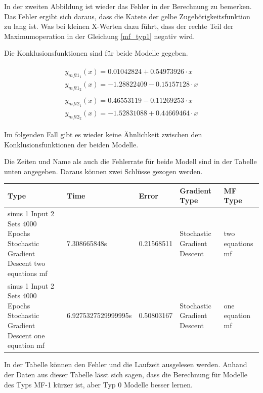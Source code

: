 In der zweiten Abbildung ist wieder das Fehler in der Berechnung zu bemerken. Das Fehler ergibt sich daraus, dass die Katete der gelbe Zugehörigkeitsfunktion zu lang ist. Was bei kleinen X-Werten dazu führt, dass der rechte Teil der Maximumoperation in der Gleichung \ref{mf_typ1} negativ wird.

Die Konklusionsfunktionen sind für beide Modelle gegeben.


\begin{align}
	\begin{split}\label{mf_0:10}
		y_{mft1_1}(x) = 0.01042824 + 0.54973926\cdot x \\
		y_{mft1_2}(x) = -1.28822409 - 0.15157128\cdot x
	\end{split} \\	
	\begin{split}\label{mf_1:10}
		y_{mft2_1}(x) = 0.46553119 - 0.11269253\cdot x \\
		y_{mft2_2}(x) = -1.52831088 + 0.44669464\cdot x
	\end{split}	
\end{align}

Im folgenden Fall gibt es wieder keine Ähnlichkeit zwischen den Konklusionsfunktionen der beiden Modelle.

Die Zeiten und Name als auch die Fehlerrate für beide Modell sind in der Tabelle unten angegeben. Daraus können zwei Schlüsse gezogen werden.

\begin{center}
	\begin{tabular}{ | p{3cm} | l | l | p{3cm} | p{3cm} |}
		\hline
		Type & Time & Error & Gradient Type & MF Type \\ \hline
		sinus 1 Input 2 Sets 4000 Epochs Stochastic Gradient Descent two equations mf&7.308665848s&0.21568511&Stochastic Gradient Descent&two equations mf
		\\ \hline
		sinus 1 Input 2 Sets 4000 Epochs Stochastic Gradient Descent one equation mf&6.9275327529999995s&0.50803167&Stochastic Gradient Descent&one equation mf\\ \hline
	\end{tabular}
\end{center}

In der Tabelle können den Fehler und die Laufzeit ausgelesen werden. Anhand der Daten aus dieser Tabelle lässt sich sagen, dass die Berechnung für Modelle des Typs MF-1 kürzer ist, aber Typ 0 Modelle besser lernen.

